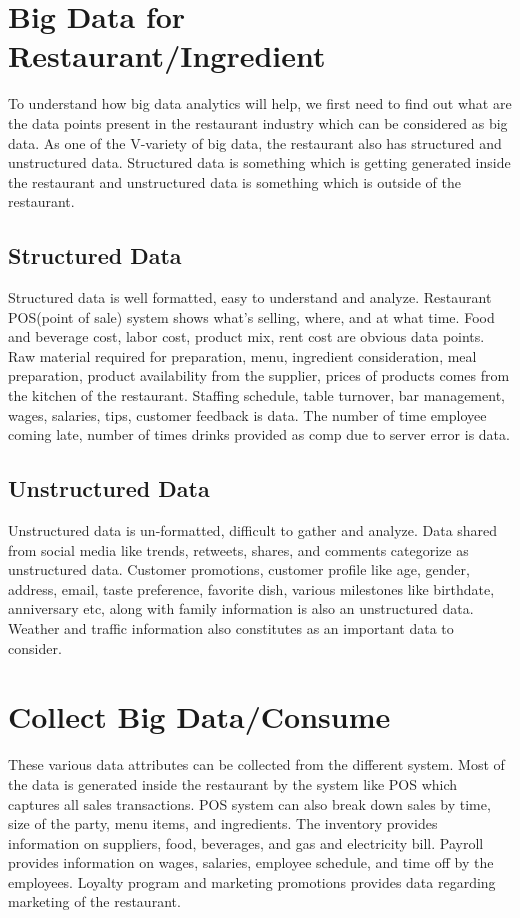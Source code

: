 \documentclass[sigconf]{acmart}
\begin{document}
\section{Big Data for Restaurant/Ingredient}
To understand how big data analytics will help, we first need to find out what are the data points present in the restaurant industry which can be considered as big data. As one of the V-variety of big data, the restaurant also has structured and unstructured data. Structured data is something which is getting generated inside the restaurant and unstructured data is something which is outside of the restaurant.
\subsection{Structured Data}
Structured data is well formatted, easy to understand and analyze. Restaurant POS(point of sale) system shows what’s selling, where, and at what time\cite{www-qsr}. Food and beverage cost, labor cost, product mix, rent cost are obvious data points. Raw material required for preparation, menu, ingredient consideration, meal preparation, product availability from the supplier, prices of products comes from the kitchen of the restaurant. Staffing schedule, table turnover, bar management, wages, salaries, tips, customer feedback is data. The number of time employee coming late, number of times drinks provided as comp due to server error is data.\cite{www-restaurant}
\subsection{Unstructured Data}
Unstructured data is un-formatted, difficult to gather and analyze. Data shared from social media like trends, retweets, shares, and comments categorize as unstructured data. Customer promotions, customer profile like age, gender, address, email, taste preference, favorite dish, various milestones like birthdate, anniversary etc, along with family information is also an unstructured data. Weather and traffic information also constitutes as an important data to consider. \cite{www-restaurant}


\section{Collect Big Data/Consume}
These various data attributes can be collected from the different system. Most of the data is generated inside the restaurant by the system like POS which captures all sales transactions. POS system can also break down sales by time, size of the party, menu items, and ingredients. The inventory provides information on suppliers, food, beverages, and gas and electricity bill. Payroll provides information on wages, salaries, employee schedule, and time off by the employees. Loyalty program and marketing promotions provides data regarding marketing of the restaurant.
\end{document}
